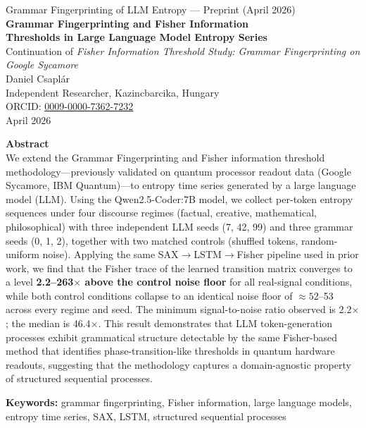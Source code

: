 \documentclass[11pt,a4paper]{article}
\begin{document}
\begin{center}
{\large Grammar Fingerprinting of LLM Entropy --- Preprint (April 2026)}\\[1.2em]
{\LARGE\bfseries Grammar Fingerprinting and Fisher Information\\[0.25em]
Thresholds in Large Language Model Entropy Series}\\[0.9em]
{\large Continuation of \textit{Fisher Information Threshold Study: Grammar Fingerprinting on Google Sycamore}}\\[0.35em]
Daniel Csapl\'ar\\
Independent Researcher, Kazincbarcika, Hungary\\
ORCID: \href{https://orcid.org/0009-0000-7362-7232}{0009-0000-7362-7232}\\
April 2026
\end{center}

\vspace{0.8em}
\noindent\textbf{Abstract}\\[0.3em]
We extend the Grammar Fingerprinting and Fisher information threshold methodology---previously validated on quantum processor readout data (Google Sycamore, IBM Quantum)---to entropy time series generated by a large language model (LLM). Using the Qwen2.5-Coder:7B model, we collect per-token entropy sequences under four discourse regimes (factual, creative, mathematical, philosophical) with three independent LLM seeds (7, 42, 99) and three grammar seeds (0, 1, 2), together with two matched controls (shuffled tokens, random-uniform noise). Applying the same SAX$\to$LSTM$\to$Fisher pipeline used in prior work, we find that the Fisher trace of the learned transition matrix converges to a level \textbf{2.2--263$\times$ above the control noise floor} for all real-signal conditions, while both control conditions collapse to an identical noise floor of $\approx52$--53 across every regime and seed. The minimum signal-to-noise ratio observed is 2.2$\times$; the median is 46.4$\times$. This result demonstrates that LLM token-generation processes exhibit grammatical structure detectable by the same Fisher-based method that identifies phase-transition-like thresholds in quantum hardware readouts, suggesting that the methodology captures a domain-agnostic property of structured sequential processes.

\vspace{0.6em}
\textbf{Keywords:} grammar fingerprinting, Fisher information, large language models, entropy time series, SAX, LSTM, structured sequential processes
\end{document}
